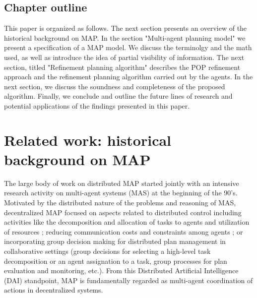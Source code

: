 \documentclass[12pt]{article}
\begin{document}
\subsection{Chapter outline}

This paper is organized as follows.
The next section presents an overview of the historical background on MAP.
In the section "Multi-agent planning model" we present a specification of a MAP model.
We discuss the terminolgy and the math used, as well as introduce the idea of partial visibility of information.
The next section, titled "Refinement planning algorithm" describes the POP refinement approach and the refinement planning algorithm carried out by the agents.
In the next section, we discuss the soundness and completeness of the proposed algorithm.
Finally, we conclude and outline the future lines of research and potential applications of the findings presented in this paper.

\section{Related work: historical background on MAP}

The large body of work on distributed MAP started jointly with an intensive research activity on multi-agent systems (MAS) at the beginning of the 90’s.
Motivated by the distributed nature of the problems and reasoning of MAS, decentralized MAP focused on aspects related to distributed control including activities like the decomposition and allocation of tasks to agents and utilization of resources \cite{120067}\cite{10.5555/3090522.3090546}; reducing communication costs and constraints among agents \cite{decker_lesser_1992}\cite{Wolverton1998ControllingCI}; or incorporating group decision making for distributed plan management in collaborative settings (group decisions for selecting a high-level task decomposition or an agent assignation to a task, group processes for plan evaluation and monitoring, etc.)\cite{Grosz1999PlanningAA}.
From this Distributed Artificial Intelligence (DAI) standpoint, MAP is fundamentally regarded as multi-agent coordination of actions in decentralized systems.
\end{document}
